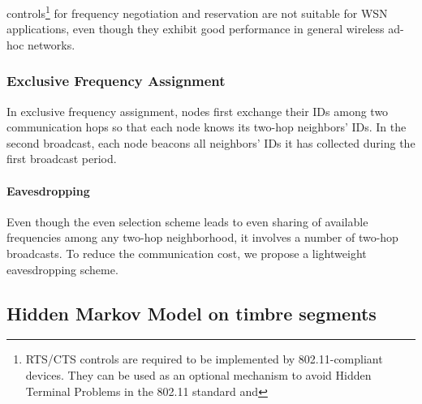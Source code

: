 \documentclass[acmtog, authorversion]{acmart}
\begin{document}
controls\footnote{RTS/CTS controls are required to be implemented by
802.11-compliant devices. They can be used as an optional mechanism
to avoid Hidden Terminal Problems in the 802.11 standard and}
for frequency negotiation and reservation are not
suitable for WSN applications, even though they exhibit good
performance in general wireless ad-hoc
networks.

\subsubsection{Exclusive Frequency Assignment}


In exclusive frequency assignment, nodes first exchange their IDs
among two communication hops so that each node knows its two-hop
neighbors' IDs. In the second broadcast, each node beacons all
neighbors' IDs it has collected during the first broadcast period.

\paragraph{Eavesdropping}

Even though the even selection scheme leads to even sharing of
available frequencies among any two-hop neighborhood, it involves a
number of two-hop broadcasts. To reduce the communication cost, we
propose a lightweight eavesdropping scheme.

\subsection{Hidden Markov Model on timbre segments}
\end{document}
